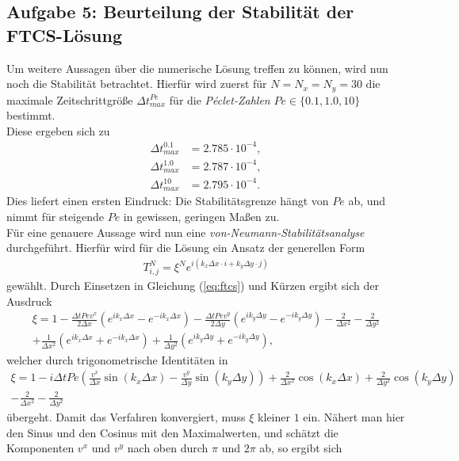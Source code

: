 \documentclass[12pt,a4paper,titlepage,headinclude,bibtotoc]{scrartcl}
\begin{document}
\subsection{Aufgabe 5: Beurteilung der Stabilität der FTCS-Lösung}
\label{sec:task5}
Um weitere Aussagen über die numerische Lösung treffen zu können, wird nun noch die Stabilität betrachtet. Hierfür wird zuerst für $N=N_x=N_y = 30$ die maximale Zeitschrittgröße $\Delta t^{Pe}_{max}$ für die \textit{Péclet-Zahlen} $Pe \in \{0.1, 1.0, 10\}$ bestimmt.\\
Diese ergeben sich zu
\begin{align*}
\Delta t^{0.1}_{max} &= 2.785 \cdot 10^{-4}, \\
\Delta t^{1.0}_{max} &= 2.787 \cdot 10^{-4}, \\
\Delta t^{10}_{max}  &= 2.795 \cdot 10^{-4}.
\end{align*}
Dies liefert einen ersten Eindruck: Die Stabilitätsgrenze hängt von $Pe$ ab, und nimmt für steigende $Pe$ in gewissen, geringen Maßen zu.\\
Für eine genauere Aussage wird nun eine \textit{von-Neumann-Stabilitätsanalyse} durchgeführt. Hierfür wird für die Lösung ein Ansatz der generellen Form
\begin{align*}
T^N_{i,j} = \xi^N e^{i(k_x \Delta x \cdot i + k_y \Delta y \cdot j)}
\end{align*}
gewählt.
Durch Einsetzen in Gleichung (\ref{eq:ftcs}) und Kürzen ergibt sich der Ausdruck
\begin{align*}
\xi = 1 - \frac{\Delta t Pe v^x}{2 \Delta x} \left( e^{i k_x \Delta x} - e^{-i k_x \Delta x} \right) - \frac{\Delta t Pe v^y}{2 \Delta y} \left( e^{i k_y \Delta y} - e^{-i k_y \Delta y} \right) -\frac{2}{\Delta x^2} - \frac{2}{\Delta y^2} \\
 + \frac{1}{\Delta x^2} \left( e^{i k_x \Delta x} + e^{-i k_x \Delta x} \right) +\frac{1}{\Delta y^2} \left( e^{i k_y \Delta y} + e^{-i k_y \Delta y} \right),
\end{align*}
welcher durch trigonometrische Identitäten in
\begin{align*}
\xi = 1 - i \Delta t Pe\left(\frac{ v^x }{\Delta x} \sin(k_x \Delta x) - \frac{v^y}{\Delta y}  \sin(k_y \Delta y) \right) + \frac{2}{\Delta x^2}\cos(k_x \Delta x) + \frac{2}{\Delta y^2}\cos(k_y \Delta y) \\
-\frac{2}{\Delta x^2} - \frac{2}{\Delta y^2}
\end{align*}
übergeht. Damit das Verfahren konvergiert, muss $\xi$ kleiner $1$ ein. Nähert man hier den Sinus und den Cosinus mit den Maximalwerten, und schätzt die Komponenten $v^x$ und $v^y$ nach oben durch $\pi$ und $2\pi$ ab, so ergibt sich
\end{document}
